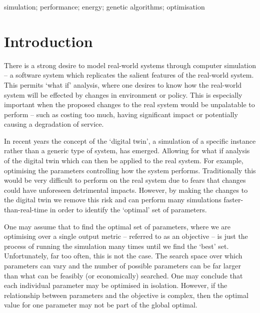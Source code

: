 \documentclass[10pt, conference, compsocconf]{IEEEtran}
\begin{document}
\begin{IEEEkeywords}
simulation; performance; energy; genetic algorithms; optimisation
\end{IEEEkeywords}

%
\IEEEpeerreviewmaketitle

\section{Introduction}
There is a strong desire to model real-world systems through computer simulation -- a software system which replicates the salient features of the real-world system. This permits `what if' analysis, where one desires to know how the real-world system will be effected by changes in environment or policy. This is especially important when the proposed changes to the real system would be unpalatable to perform -- such as costing too much, having significant impact or potentially causing a degradation of service. 

In recent years the concept of the `digital twin', a simulation of a specific instance rather than a generic type of system, has emerged. Allowing for what if analysis of the digital twin which can then be applied to the real system. For example, optimising the parameters controlling how the system performs. Traditionally this would be very difficult to perform on the real system due to fears that changes could have unforeseen detrimental impacts. However, by making the changes to the digital twin we remove this risk and can perform many simulations faster-than-real-time in order to identify the `optimal' set of parameters.

One may assume that to find the optimal set of parameters, where we are optimising over a single output metric -- referred to as an objective -- is just the process of running the simulation many times until we find the `best' set. Unfortunately, far too often, this is not the case. The search space over which parameters can vary and the number of possible parameters can be far larger than what can be feasibly (or economically) searched. One may conclude that each individual parameter may be optimised in isolation. However, if the relationship between parameters and the objective is complex, then the optimal value for one parameter may not be part of the global optimal. 
\end{document}
